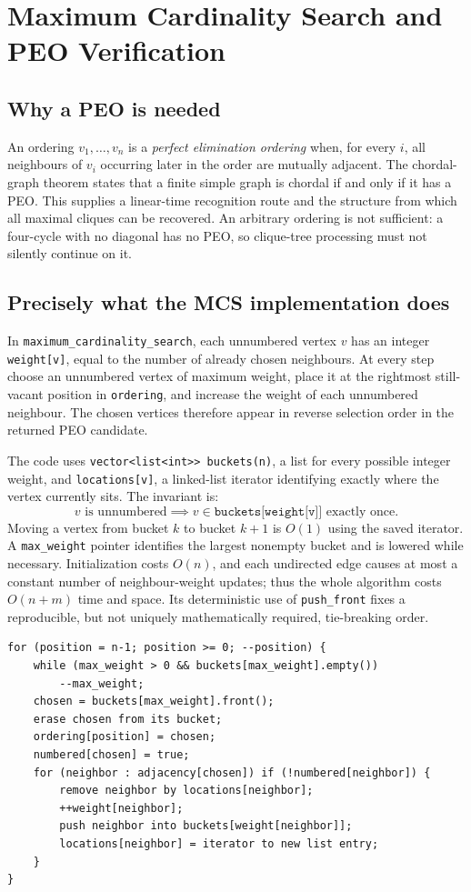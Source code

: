 \section{Maximum Cardinality Search and PEO Verification}
\label{sec:mcs-detail}
\subsection{Why a PEO is needed}
An ordering \(v_1,\ldots,v_n\) is a \emph{perfect elimination ordering} when, for every \(i\), all neighbours of \(v_i\) occurring later in the order are mutually adjacent.  The chordal-graph theorem states that a finite simple graph is chordal if and only if it has a PEO.  This supplies a linear-time recognition route and the structure from which all maximal cliques can be recovered.  An arbitrary ordering is not sufficient: a four-cycle with no diagonal has no PEO, so clique-tree processing must not silently continue on it.

\subsection{Precisely what the MCS implementation does}
In \texttt{maximum\_cardinality\_search}, each unnumbered vertex \(v\) has an integer \texttt{weight[v]}, equal to the number of already chosen neighbours.  At every step choose an unnumbered vertex of maximum weight, place it at the rightmost still-vacant position in \texttt{ordering}, and increase the weight of each unnumbered neighbour.  The chosen vertices therefore appear in reverse selection order in the returned PEO candidate.

The code uses \texttt{vector<list<int>> buckets(n)}, a list for every possible integer weight, and \texttt{locations[v]}, a linked-list iterator identifying exactly where the vertex currently sits.  The invariant is:
\[
  v\text{ is unnumbered}\implies v\in\texttt{buckets[weight[v]]}
  \text{ exactly once}.
\]
Moving a vertex from bucket \(k\) to bucket \(k+1\) is \(O(1)\) using the saved iterator.  A \texttt{max\_weight} pointer identifies the largest nonempty bucket and is lowered while necessary.  Initialization costs \(O(n)\), and each undirected edge causes at most a constant number of neighbour-weight updates; thus the whole algorithm costs \(O(n+m)\) time and space.  Its deterministic use of \texttt{push\_front} fixes a reproducible, but not uniquely mathematically required, tie-breaking order.

\begin{lstlisting}[caption={MCS logic, simplified from src/mcs.cpp.}]
for (position = n-1; position >= 0; --position) {
    while (max_weight > 0 && buckets[max_weight].empty())
        --max_weight;
    chosen = buckets[max_weight].front();
    erase chosen from its bucket;
    ordering[position] = chosen;
    numbered[chosen] = true;
    for (neighbor : adjacency[chosen]) if (!numbered[neighbor]) {
        remove neighbor by locations[neighbor];
        ++weight[neighbor];
        push neighbor into buckets[weight[neighbor]];
        locations[neighbor] = iterator to new list entry;
    }
}
\end{lstlisting}
